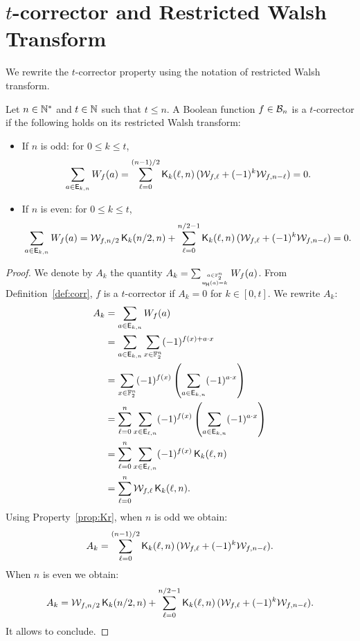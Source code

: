 \documentclass[11pt]{llncs}
\begin{document}

\section{$t$-corrector and Restricted Walsh Transform}\label{sec:corr}



We rewrite the $t$-corrector property using the notation of restricted Walsh transform.

\begin{proposition}\label{prop:WalsCorr}
	Let $n\in \mathbb{N}^*$ and $t\in \mathbb{N}$ such that $t\le n$. A Boolean function $f\in \mathcal{B}_{n}$ is a $t$-corrector if the following holds on its restricted Walsh transform:
	\begin{itemize}
		\item If $n$ is odd: for $0\le k \le t$,
		\[\sum_{a\in \mathsf{E}_{k,n}} W_{f}(a)=\sum_{\ell=0}^{(n-1)/2} \mathsf{K}_{k}(\ell,n) \, ( \mathcal{W}_{f,\ell} + (-1)^k \mathcal{W}_{f,n-\ell})=0.\]
	\item If $n$ is even: for $0\le k \le t$,
		\[\sum_{a\in \mathsf{E}_{k,n}} W_{f}(a)=\mathcal{W}_{f,n/2} \, \mathsf{K}_{k}(n/2,n)+ \sum_{\ell=0}^{n/2-1} \mathsf{K}_{k}(\ell,n) \, ( \mathcal{W}_{f,\ell} + (-1)^k \mathcal{W}_{f,n-\ell})=0.\]
	\end{itemize}




\end{proposition}
\begin{proof}

We denote by $A_k$ the quantity $A_k=\sum_{a\in \mathbb{F}_2^n \atop{\mathsf{w_H}(a)=k}} W_{f}(a)$.
From Definition~\ref{def:corr}, $f$ is a $t$-corrector if $A_k=0$ for $k\in [0,t]$.
We rewrite $A_k$:
\begin{align*}
A_k&=\sum_{a\in \mathsf{E}_{k,n}} W_{f}(a)\\
&=\sum_{a\in \mathsf{E}_{k,n}} \sum_{x\in \mathbb{F}_2^n} (-1)^{f(x)+a \cdot x}\\
&= \sum_{x\in \mathbb{F}_2^n} (-1)^{f(x)}  \left(\sum_{a\in \mathsf{E}_{k,n}}(-1)^{a \cdot x}\right)\\
&=\sum_{\ell=0}^{n} \sum_{x\in \mathsf{E}_{\ell,n}} (-1)^{f(x)}  \left(\sum_{a\in \mathsf{E}_{k,n}}(-1)^{a \cdot x}\right)\\
&=\sum_{\ell=0}^{n} \sum_{x\in \mathsf{E}_{\ell,n}} (-1)^{f(x)} \,  \mathsf{K}_{k}(\ell,n)\\
&=\sum_{\ell=0}^{n} \mathcal{W}_{f,\ell} \, \mathsf{K}_{k}(\ell,n).
\end{align*}
Using Property~\ref{prop:Kr}, when $n$ is odd we obtain:
\[A_k=\sum_{\ell=0}^{(n-1)/2} \mathsf{K}_{k}(\ell,n) \, ( \mathcal{W}_{f,\ell} + (-1)^k \mathcal{W}_{f,n-\ell}). \]
When $n$ is even we obtain:
\[A_k=\mathcal{W}_{f,n/2} \, \mathsf{K}_{k}(n/2,n)+ \sum_{\ell=0}^{n/2-1} \mathsf{K}_{k}(\ell,n) \, ( \mathcal{W}_{f,\ell} + (-1)^k \mathcal{W}_{f,n-\ell}). \]
It allows to conclude.

\end{proof}
\end{document}

